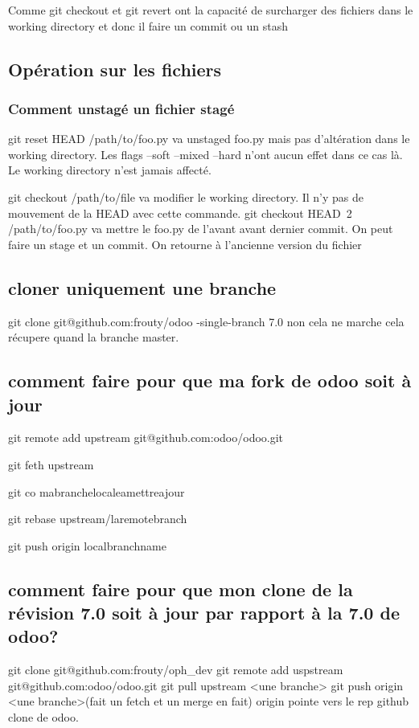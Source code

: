 \documentclass[12pt,a4paper]{article}
\begin{document}
Comme git checkout et git revert ont la capacité de surcharger des fichiers dans le working directory et donc il faire un commit ou un stash

\subsection{Opération sur les fichiers}
\subsubsection{Comment unstagé un fichier stagé}
git reset HEAD /path/to/foo.py va unstaged foo.py mais pas d'altération dans le working directory.
Les flags --soft --mixed --hard n'ont aucun effet dans ce cas là. Le working directory n'est jamais affecté.

git checkout /path/to/file va modifier le working directory. Il n'y pas de mouvement de la HEAD avec cette commande.
git checkout HEAD~2 /path/to/foo.py va mettre le foo.py de l'avant avant dernier commit. 
On peut faire un stage et un commit. On retourne à l'ancienne version du fichier 

\subsection{cloner uniquement une branche}
git clone git@github.com:frouty/odoo -single-branch 7.0
non cela ne marche cela récupere quand la branche master.

\subsection{comment faire pour que ma fork de odoo soit à jour}
git remote add upstream git@github.com:odoo/odoo.git

git feth upstream

git co mabranchelocaleamettreajour

git rebase upstream/laremotebranch

git push origin localbranchname

\subsection{comment faire pour que mon clone de la révision 7.0 soit à jour par rapport à la 7.0 de odoo?}

git clone git@github.com:frouty/oph\_dev
git remote add uspstream git@github.com:odoo/odoo.git
git pull upstream <une branche>
git push origin <une branche>(fait un fetch et un merge en fait)
origin pointe vers le rep github clone de odoo.
\end{document}
